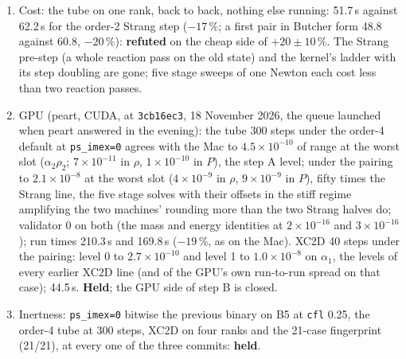 \documentclass[11pt,a4paper]{article}
\newcommand{\code}[1]{\texttt{\small #1}}
\begin{document}
\begin{enumerate}[nosep]
      and the SSPRK path evaluates its first stage on the raw old state,
      which the reaction step leaves off the manifold when it applies no
      operator; in production the old state is on it.  \textbf{Held} on
      the guards, the difference recorded.  demo3 to step 50 on six
      ranks: contact window $8.79\times10^{-5}$ / 1 and front
      $7.76\times10^{-3}$ / 1 (step A $8.79\times10^{-5}$,
      $7.76\times10^{-3}$), symmetry $2.6\times10^{-6}$\,Pa, the fields
      within $5.6\times10^{-3}$ of range on the finest level
      ($3.6\times10^{-3}$ in $\rho$, $1.5\times10^{-3}$ in $P$); 8904
      stands and 70 dropped over 2100 sweeps, no Newton, base or final
      fallback; 12.2\,s against 11.8: \textbf{held}.  Conservation on
      \code{inputs-fb-rk2} (two levels, 40 steps, the totals from the
      plotfiles with the covered coarse cells excluded): mass
      $1.5\times10^{-15}$ and $\rho E$ $1.8\times10^{-15}$ relative
      ($1.7$ and $1.9\times10^{-15}$ under the present stepping):
      \textbf{held}.
\item Cost: the tube on one rank, back to back, nothing else running:
      51.7\,s against 62.2\,s for the order-2 Strang step ($-17\,\%$;
      a first pair in Butcher form 48.8 against 60.8, $-20\,\%$):
      \textbf{refuted} on the cheap side of $+20\pm10\,\%$.  The Strang
      pre-step (a whole reaction pass on the old state) and the
      kernel's ladder with its step doubling are gone; five stage sweeps
      of one Newton each cost less than two reaction passes.
\item GPU (peart, CUDA, at \code{3cb16ec3}, 18 November 2026, the queue
      launched when peart answered in the evening): the tube 300 steps
      under the order-4 default at \code{ps\_imex=0} agrees with the Mac
      to $4.5\times10^{-10}$ of range at the worst slot ($\alpha_2\rho_2$;
      $7\times10^{-11}$ in $\rho$, $1\times10^{-10}$ in $P$), the step A
      level; under the pairing to $2.1\times10^{-8}$ at the worst slot
      ($4\times10^{-9}$ in $\rho$, $9\times10^{-9}$ in $P$), fifty times
      the Strang line, the five stage solves with their offsets in the
      stiff regime amplifying the two machines' rounding more than the
      two Strang halves do; validator 0 on both (the mass and energy
      identities at $2\times10^{-16}$ and $3\times10^{-16}$); run times
      210.3\,s and 169.8\,s ($-19\,\%$, as on the Mac).  XC2D 40 steps
      under the pairing: level 0 to $2.7\times10^{-10}$ and level 1 to
      $1.0\times10^{-8}$ on $\alpha_1$, the levels of every earlier XC2D
      line (and of the GPU's own run-to-run spread on that case); 44.5\,s.
      \textbf{Held}; the GPU side of step B is closed.
\item Inertness: \code{ps\_imex=0} bitwise the previous binary on B5 at
      \code{cfl} 0.25, the order-4 tube at 300 steps, XC2D on four
      ranks and the 21-case fingerprint (21/21), at every one of the
      three commits: \textbf{held}.
\end{enumerate}
\end{document}
